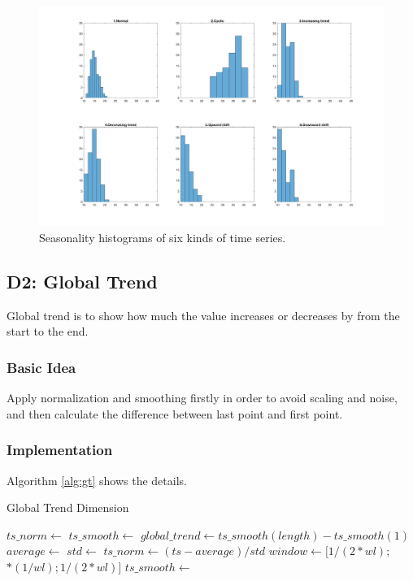\documentclass[a4paper]{article}
\begin{document}
\begin{figure}[htbp]
\centering
\includegraphics[width=1\textwidth]{seasonality.png}
\caption{\label{fig:seasonality}Seasonality histograms of six kinds of time series.}
\end{figure}

\subsection{D2: Global Trend}
Global trend is to show how much the value increases or decreases by from the start to the end. 

\subsubsection{Basic Idea}
Apply normalization and smoothing firstly in order to avoid scaling and noise, and then calculate the difference between last point and first point.

\subsubsection{Implementation}
Algorithm \ref{alg:gt} shows the details.

\begin{algorithm}
\caption{Global Trend Dimension} \label{alg:gt}
\begin{algorithmic}[1] 
	\State $ts\_norm \gets$ 
	\State $ts\_smooth \gets$ 
	\State $global\_trend \gets ts\_smooth(length) - ts\_smooth(1)$
	\State
		\State $average \gets$ 
		\State $std \gets$ 
		\State $ts\_norm \gets (ts - average) / std$
		\State {}
	\EndFunction
	\State
		\State $window \gets [1/(2*wl);$ $*(1/wl); 1/(2*wl)]$
		\State $ts\_smooth \gets$ 
		\State {}
	\EndFunction
\end{algorithmic}
\end{algorithm}
\end{document}
